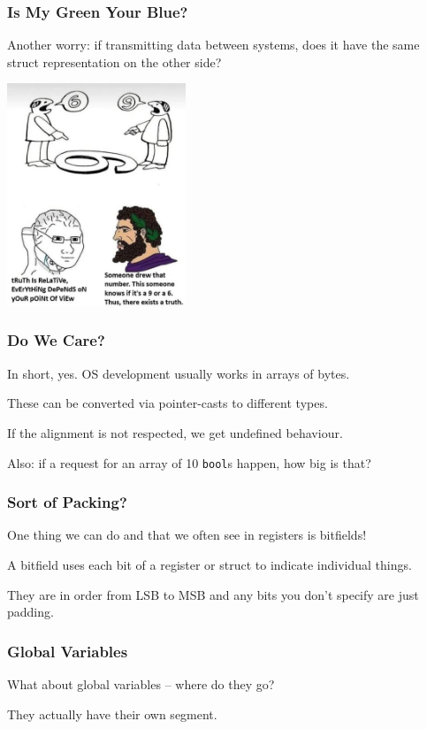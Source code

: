 \begin{frame}
\frametitle{Is My Green Your Blue?}

Another worry: if transmitting data between systems, does it have the same struct representation on the other side?

\begin{center}
  \includegraphics[width=0.4\textwidth]{images/6or9.jpg}
\end{center}

\end{frame}

\begin{frame}
\frametitle{Do We Care?}

In short, yes. OS development usually works in arrays of bytes.

These can be converted via pointer-casts to different types.

If the alignment is not respected, we get undefined behaviour.

Also: if a request for an array of 10 \texttt{bool}s happen, how big is that?

\end{frame}

\begin{frame}
\frametitle{Sort of Packing?}

One thing we can do and that we often see in registers is bitfields!

A bitfield uses each bit of a register or struct to indicate individual things.

They are in order from LSB to MSB and any bits you don't specify are just padding. 

\end{frame}

\begin{frame}
\frametitle{Global Variables}

What about global variables -- where do they go?

They actually have their own segment. 

\end{frame}

